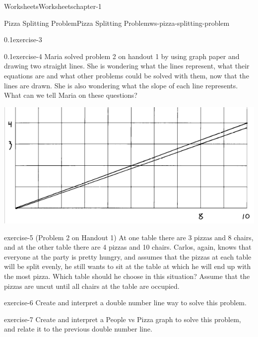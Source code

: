 \documentclass[twoside,11pt,]{book}
\begin{document}
\begin{chapterptx}{Worksheets}{}{Worksheets}{}{}{chapter-1}
\begin{worksheet-section-numberless}{Pizza Splitting Problem}{}{Pizza Splitting Problem}{}{}{ws-pizza-splitting-problem}
\begin{divisionexercise}{3}{}{0.1}{exercise-3}
\end{divisionexercise}%
\clearpage
\begin{divisionexercise}{4}{}{0.1}{exercise-4}%
\hypertarget{p-6}{}%
Maria solved problem 2 on handout 1 by using graph paper and drawing two straight lines.  She is wondering what the lines represent, what their equations are and what other problems could be solved with them, now that the lines are drawn.  She is also wondering what the slope of each line represents.  What can we tell Maria on these questions?%
\begin{sidebyside}{1}{0.05}{0.05}{0}%
\begin{sbspanel}{0.9}%
\includegraphics[width=1\linewidth]{images/pizza-splitting-problem.png}
\end{sbspanel}%
\end{sidebyside}%
\end{divisionexercise}%
\begin{divisionexercise}{5}{}{}{exercise-5}%
\hypertarget{p-7}{}%
(Problem 2 on Handout 1) At one table there are 3 pizzas and 8 chairs, and at the other table there are 4 pizzas and 10 chairs.  Carlos, again, knows that everyone at the party is pretty hungry, and assumes that the pizzas at each table will be split evenly, he still wants to sit at the table at which he will end up with the most pizza.  Which table should he choose in this situation? Assume that the pizzas are uncut until all chairs at the table are occupied.%
\end{divisionexercise}%
\begin{divisionexercise}{6}{}{}{exercise-6}%
\hypertarget{p-8}{}%
Create and interpret a double number line way to solve this problem.%
\end{divisionexercise}%
\begin{divisionexercise}{7}{}{}{exercise-7}%
\hypertarget{p-9}{}%
Create and interpret a People vs Pizza graph to solve this problem, and relate it to the previous double number line.%

\end{divisionexercise}
\end{worksheet-section-numberless}
\end{chapterptx}
\end{document}
